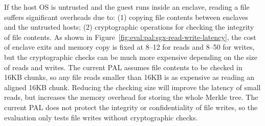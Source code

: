 
If the host OS is untrusted and the guest runs inside an enclave,
reading a file suffers
significant overheads
due to:
(1) copying file contents between enclaves and the untrusted hosts; (2) cryptographic operations for checking the integrity of file contents.  
As shown in Figure~\ref{fig:eval:pal:sgx-read-write-latency},
the cost of enclave exits
and memory copy is fixed at
8--12 \usec{} for reads and 8--50 \usec{} for writes,
but the cryptographic checks
can be much more expensive depending on the size of reads and writes.
The current \sgx{} PAL
assumes file contents to be checked in 16KB chunks,
so any file reads smaller than 16KB is as expensive as reading an aligned 16KB chunk. 
Reducing the checking size
will improve
the latency of small reads,
but increases the memory overhead for storing the whole Merkle tree.
The current \sgx{} PAL does not protect the integrity or confidentiality of file writes,
so the evaluation only tests file writes
without cryptographic checks.








